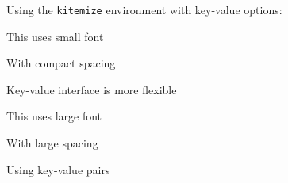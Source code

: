 \documentclass{article}
\begin{document}
Using the \texttt{kitemize} environment with key-value options:

\begin{kitemize}[fs=small,sep=S]
  \item This uses small font
  \item With compact spacing
  \item Key-value interface is more flexible
\end{kitemize}

\begin{kitemize}[fs=large,sep=L]
  \item This uses large font
  \item With large spacing
  \item Using key-value pairs
\end{kitemize}
\end{document}
